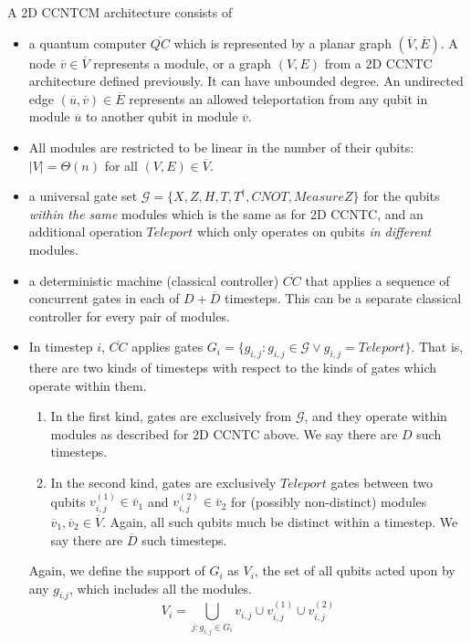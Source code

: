 \begin{definition}
A \textsf{2D CCNTCM} architecture consists of

\begin{itemize}
\item a quantum computer $\overline{QC}$ which is represented by a planar graph $(\overline{V},\overline{E})$. A
node $\overline{v} \in \overline{V}$ represents a module, or a graph $(V,E)$
from a \textsf{2D CCNTC} architecture defined previously. It can have
unbounded degree.
An
undirected edge $(\overline{u},\overline{v}) \in \overline{E}$ represents an
allowed teleportation from any qubit in module $\overline{u}$ to
another qubit in module $\overline{v}$.
\item All modules are restricted to be linear in the number of their qubits:
$|V| = \Theta(n)$ for all $(V,E) \in \overline{V}$.
\item a universal gate set $\mathcal{G} = \{X, Z, H, T, T^{\dagger}, CNOT,
MeasureZ\}$
for the qubits \emph{within the same} modules which is the same as for \textsf{2D CCNTC},
and an additional operation $Teleport$ which only operates on qubits
\emph{in
different} modules.
\item a deterministic machine (classical controller) $\overline{CC}$ that applies a sequence
of concurrent gates in each of $D+\overline{D}$ timesteps.
This can be a separate classical controller
for every pair of modules.
\item In timestep $i$, $\overline{CC}$ applies
gates $G_i = \{g_{i,j} : g_{i,j} \in \mathcal{G} \lor g_{i,j} = Teleport \}$.
That is, there are two kinds of timesteps with respect to the kinds of gates
which operate within them.
\begin{enumerate}
\item In the first kind, gates are exclusively from $\mathcal{G}$, and
they operate within modules as described
for \textsf{2D CCNTC} above. We say there are $D$ such timesteps.
\item In the second kind, gates are exclusively $Teleport$ gates between two qubits $v^{(1)}_{i,j} \in \overline{v}_1$ and
$v^{(2)}_{i,j} \in \overline{v}_2$ for
(possibly non-distinct) modules $\overline{v}_1, \overline{v}_2 \in \overline{V}$.
Again, all such qubits much be distinct within a timestep.
We say there are $\overline{D}$ such timesteps.
\end{enumerate}

Again, we define the support of $G_i$
as $V_i$, the set of all qubits acted upon by any $g_{i.j}$, which
includes all the modules.
\begin{equation}
V_i = \bigcup_{j: g_{i,j} \in G_i} v_{i,j} \cup v^{(1)}_{i,j} \cup v^{(2)}_{i,j} 
\end{equation}

\end{itemize}
\end{definition}

